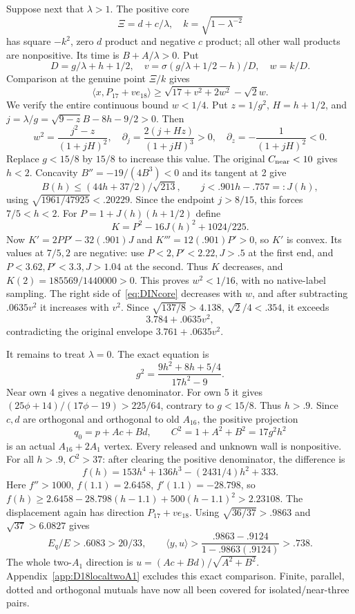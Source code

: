 \documentclass[11pt]{article}
\theoremstyle{definition}
\theoremstyle{remark}
\newcommand{\ip}[2]{\langle #1,#2\rangle}
\begin{document}
Suppose next that \(\lambda>1\).
The positive core
\[
 \Xi=d+c/\lambda,\quad k=\sqrt{1-\lambda^{-2}}
\]
has square \(-k^2\), zero \(d\) product and negative \(c\)
product; all other wall products are nonpositive.
Its time is \(B+A/\lambda>0\).
Put
\[
 D=g/\lambda+h+1/2,\quad
 v=\sigma(g/\lambda+1/2-h)/D,\quad w=k/D.
\]
Comparison at the genuine point \(\Xi/k\) gives
\[
 \ip x{P_{17}+ve_{18}}
 \ge\sqrt{17+v^2+2w^2}-\sqrt2w .
\tag{DINcore}\label{eq:DINcore}
\]
We verify the entire continuous bound \(w<1/4\).
Put \(z=1/g^2\), \(H=h+1/2\), and
\(j=\lambda/g=\sqrt{9-z}B-8h-9/2>0\).
Then
\[
 w^2={\frac{j^2-z}{(1+jH)^2}},\quad
 \partial_j={\frac{2(j+Hz)}{(1+jH)^3}}>0,\quad
 \partial_z=-{\frac{1}{(1+jH)^2}}<0 .
\]
Replace \(g<15/8\) by \(15/8\) to increase this value.
The original \(C_{\rm near}<10\) gives \(h<2\).
Concavity \(B''=-19/(4B^3)<0\) and its tangent at 2 give
\[
 B(h)\le(44h+37/2)/\sqrt{213},\qquad
 j<.901h-.757=:J(h),
\]
using \(\sqrt{1961/47925}<.20229\).
Since the endpoint \(j>8/15\), this forces \(7/5<h<2\).
For \(P=1+J(h)(h+1/2)\) define
\[
 K=P^2-16J(h)^2+1024/225 .
\]
Now \(K'=2PP'-32(.901)J\) and
\(K'''=12(.901)P'>0\), so \(K'\) is convex.
Its values at \(7/5,2\) are negative:
use \(P<2,P'<2.22,J>.5\) at the first end,
and \(P<3.62,P'<3.3,J>1.04\) at the second.
Thus \(K\) decreases, and
\(K(2)=185569/1440000>0\).
This proves \(w^2<1/16\), with no native-label sampling.
The right side of~\eqref{eq:DINcore} decreases with \(w\),
and after subtracting \(.0635v^2\) it increases with \(v^2\).
Since \(\sqrt{137/8}>4.138\), \(\sqrt2/4<.354\), it exceeds
\[
                3.784+.0635v^2,
\]
contradicting the original envelope
\(3.761+.0635v^2\).

It remains to treat \(\lambda=0\).
The exact equation is
\[
 g^2={\frac{9h^2+8h+5/4}{17h^2-9}}.
\]
Near own 4 gives a negative denominator.
For own 5 it gives
\((25\phi+14)/(17\phi-19)>225/64\), contrary to \(g<15/8\).
Thus \(h>.9\).
Since \(c,d\) are orthogonal and orthogonal to old \(A_{16}\),
the positive projection
\[
 q_0=p+Ac+Bd,\qquad C^2=1+A^2+B^2=17g^2h^2
\]
is an actual \(A_{16}+2A_1\) vertex.
Every released and unknown wall is nonpositive.
For all \(h>.9\), \(C^2>37\):
after clearing the positive denominator, the difference is
\[
 f(h)=153h^4+136h^3-(2431/4)h^2+333.
\]
Here \(f''>1000\), \(f(1.1)=2.6458\), \(f'(1.1)=-28.798\),
so
\(f(h)\ge2.6458-28.798(h-1.1)+500(h-1.1)^2
>2.23108\).
The displacement again has direction \(P_{17}+ve_{18}\).
Using \(\sqrt{36/37}>.9863\) and \(\sqrt{37}>6.0827\)
gives
\[
 E_q/E>.6083>20/33,\qquad
 \ip yu>{\frac{.9863-.9124}{1-.9863(.9124)}}>.738 .
\]
The whole two-\(A_1\) direction is
\(u=(Ac+Bd)/\sqrt{A^2+B^2}\).
Appendix~\ref{app:D18localtwoA1} excludes this exact comparison.
Finite, parallel, dotted and orthogonal mutuals have now all been
covered for isolated/near-three pairs.
\end{document}
